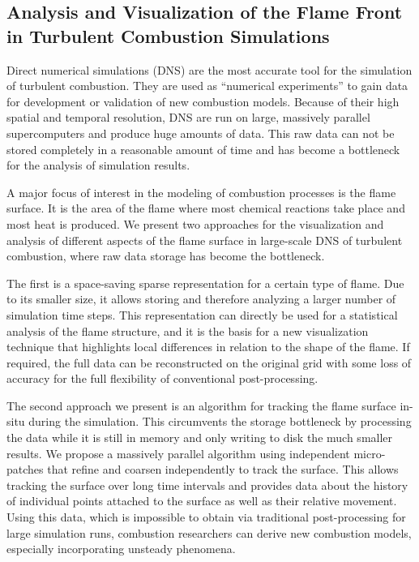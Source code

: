 \subsection{Analysis and Visualization of the Flame Front in Turbulent
Combustion Simulations} %
\label{sub:contr_flame_vis}
%
Direct numerical simulations (\acs{DNS}) are the most accurate tool
for the simulation of turbulent combustion.
%
They are used as ``numerical experiments'' to gain data for development or
validation of new combustion models.
%
Because of their high spatial and temporal resolution, \ac{DNS} are run on
large, massively parallel supercomputers and produce huge amounts of data.
%
This raw data can not be stored completely in a reasonable amount of time and
has become a bottleneck for the analysis of simulation results.
%

%
A major focus of interest in the modeling of combustion processes is the flame
surface.
%
It is the area of the flame where most chemical reactions take place and most
heat is produced.
%
We present two approaches for the visualization and analysis of different
aspects of the flame surface in large-scale \ac{DNS} of turbulent combustion,
where raw data storage has become the bottleneck.
%

%
The first is a space-saving sparse representation for a certain type of flame.
%
Due to its smaller size, it allows storing and therefore analyzing a larger
number of simulation time steps.
%
This representation can directly be used for a statistical analysis of the flame
structure, and it is the basis for a new visualization technique that highlights
local differences in relation to the shape of the flame.
%
If required, the full data can be reconstructed on the original grid with some
loss of accuracy for the full flexibility of conventional post-processing.
%

%
The second approach we present is an algorithm for tracking the flame surface
in-situ during the simulation.
%
This circumvents the storage bottleneck by processing the data while it is still
in memory and only writing to disk the much smaller results.
%
We propose a massively parallel algorithm using independent micro-patches that
refine and coarsen independently to track the surface.
%
This allows tracking the surface over long time intervals and provides data
about the history of individual points attached to the surface as well as their
relative movement.
%
Using this data, which is impossible to obtain via traditional post-processing
for large simulation runs, combustion researchers can derive new combustion
models, especially incorporating unsteady phenomena.
%
%

